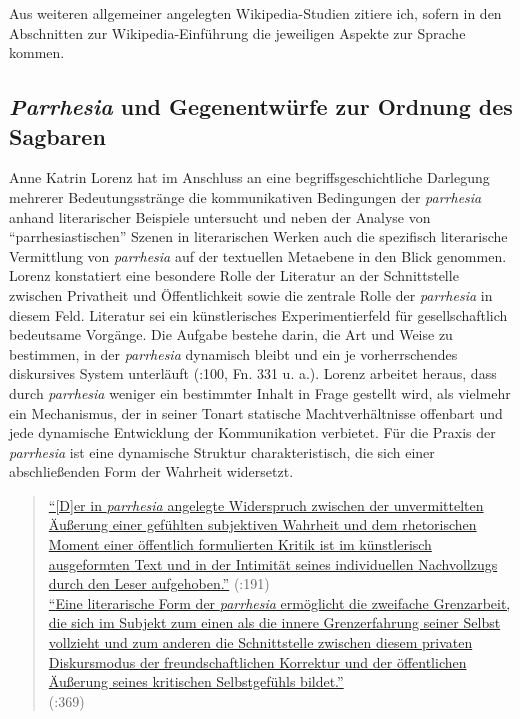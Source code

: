 \documentclass[fontsize=12pt]{scrartcl}
\begin{document}
Aus weiteren allgemeiner angelegten Wi\-ki\-pe\-dia-Studien zitiere ich, sofern in den Abschnitten zur Wi\-ki\-pe\-dia-Einf\"uh\-rung die jeweiligen Aspekte zur Sprache kommen.

\subsection{\textit{Parrhesia} und Gegenentw\"urfe zur Ordnung des Sagbaren}
\label{subsec:3.4}

Anne Katrin Lorenz hat im Anschluss an eine begriffsgeschichtliche Darlegung meh\-rerer Bedeutungsstr\"ange die kommunikativen Bedingungen der \textit{parrhesia} anhand li\-te\-ra\-rischer Beispiele untersucht und neben der Ana\-lyse von "`parrhesiastischen"' Szenen in li\-te\-ra\-rischen Werken auch die spezifisch li\-te\-ra\-rische Ver\-mitt\-lung von \textit{parrhesia} auf der textuellen Metaebene in den Blick genommen. Lorenz konstatiert eine besondere Rolle der Li\-te\-ra\-tur an der Schnittstelle zwischen Privatheit und \"Of\-fent\-lichkeit sowie die zentrale Rolle der \textit{parrhesia} in diesem Feld. Li\-te\-ra\-tur sei ein k\"unstlerisches Experimentierfeld f\"ur ge\-sell\-schaftlich bedeutsame Vorg\"ange. Die Aufgabe bestehe darin, die Art und Weise zu bestimmen, in der \textit{parrhesia} dynamisch bleibt und ein je vor\-herr\-schen\-des diskursives System unterl\"auft (\cite{Lorenz2012}:100, Fn. 331 u. a.). Lorenz arbeitet he\-raus, dass durch \textit{parrhesia} weniger ein bestimmter Inhalt in Frage gestellt wird, als vielmehr ein Mechanismus, der in seiner Tonart statische Machtverh\"altnisse offenbart und jede dynamische Entwicklung der Kommunikation verbietet. F\"ur die Praxis der \textit{parrhesia} ist eine dynamische Struktur charakteristisch, die sich einer abschlie{\ss}enden Form der Wahrheit widersetzt. 

\singlespacing
\begin{quote}
\href{https://publikationen.uni-tuebingen.de/xmlui/handle/10900/47049}{"`[D]er in \textit{parrhesia} angelegte Widerspruch zwischen der unvermittelten \"Au{\ss}erung einer \flq ge\-f\"uhlten\frq \,\,subjektiven Wahrheit und dem rhetorischen Moment einer \"of\-fent\-lich formulierten Kritik ist im k\"unstlerisch ausgeformten Text und in der Intimit\"at seines individuellen Nachvollzugs durch den Leser aufgehoben."'} (\cite{Lorenz2012}:191)\\
\href{https://publikationen.uni-tuebingen.de/xmlui/handle/10900/47049}{"`Eine literarische Form der \textit{parrhesia} erm\"oglicht die zweifache \flq Grenz\-arbeit\frq, die sich im Subjekt zum einen als die innere Grenzerfah\-rung seiner Selbst vollzieht und zum anderen die Schnittstelle zwischen diesem privaten Diskursmodus der freundschaftlichen Korrektur und der \"of\-fent\-lichen \"Au{\ss}erung seines kritischen Selbstge\-f\"uhls bildet."'}\\ (\cite{Lorenz2012}:369)
\end{quote}
\onehalfspacing
\end{document}
